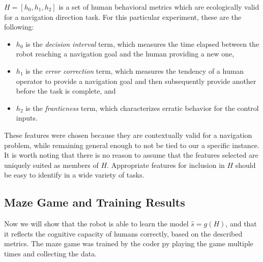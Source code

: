 \documentclass{sig-alternate}
\begin{document}
$H = [h_0, h_1, h_2]$ is a set of human behavioral metrics which are
ecologically valid for a navigation direction task.  For this
particular experiment, these are the following:

\begin{itemize}
\item $h_0$ is the \emph{decision interval} term, which measures the
  time elapsed between the robot reaching a navigation goal and the
  human providing a new one,
\item $h_1$ is the \emph{error correction} term, which measures the
  tendency of a human operator to provide a navigation goal and then
  subsequently provide another before the task is complete, and
\item $h_2$ is the \emph{franticness} term, which characterizes erratic behavior for the control inputs.
\end{itemize}

These features were chosen because they are contextually valid for a navigation problem, while remaining general enough to not be tied to our a specific instance. It is worth noting that there is no reason to
assume that the features selected are  uniquely suited as members of $H$.
Appropriate features for inclusion in $H$ should be easy to identify
in a wide variety of tasks.

\subsection{Maze Game and Training Results}
Now we will show that the robot is able to learn the model $\hat{s} =
g(H)$, and that it reflects the cognitive capacity of humans
correctly, based on the described metrics. The maze game was trained by the coder py playing the game
multiple times and collecting the data.

\end{document}
